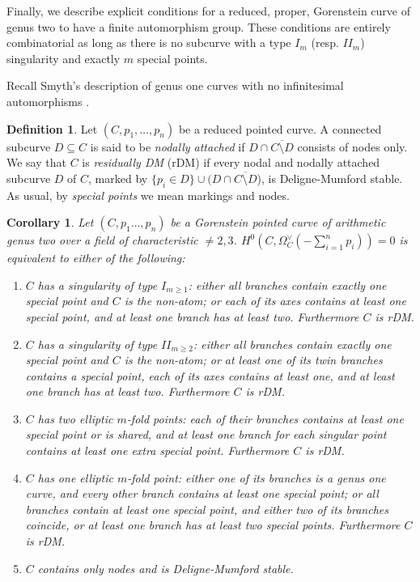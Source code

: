 \documentclass{compositio}
\theoremstyle{plain}
\newtheorem{cor}[thm]{Corollary}
\theoremstyle{definition}
\newtheorem{definition}[thm]{Definition}
\theoremstyle{remark}
\begin{document}
Finally, we describe explicit conditions for a reduced, proper, Gorenstein curve of genus two to have a finite automorphism group. These conditions are entirely combinatorial as long as there is no subcurve with a type $I_m$ (resp. $I\!I_m$) singularity and exactly $m$ special points. 

Recall Smyth's description of genus one curves with no infinitesimal automorphisms \cite[Proposition 2.3, Corollary 2.4]{SMY1}.

\begin{definition}
 Let $(C,p_1,\ldots,p_n)$ be a reduced pointed curve. A connected subcurve $D\subseteq C$ is said to be \emph{nodally attached} if $D\cap\overline{C\setminus D}$ consists of nodes only.
  We say that $C$ is \emph{residually DM} (rDM) if every nodal and nodally attached subcurve $D$ of $C$, marked by $\{p_i\in D\}\cup (D\cap\overline{C\setminus D}$), is Deligne-Mumford stable. As usual, by \emph{special points} we mean markings and nodes.
\end{definition}

\begin{cor}\label{cor:explicitnoaut}
 Let $(C,p_1\ldots,p_n)$ be a Gorenstein pointed curve of arithmetic genus two over a field of characteristic $\neq2,3$. $H^0(C,\Omega_C^\vee(-\sum_{i=1}^n p_i))=0$ is equivalent to either of the following:
 \begin{enumerate}[leftmargin=.6cm]
  \item $C$ has a singularity of type $I_{m\geq 1}$: either all branches contain exactly one special point and $C$ is the non-atom; or each of its axes contains at least one special point, and at least one branch has at least two. Furthermore $C$ is rDM.
  \item $C$ has a singularity of type $I\!I_{m\geq 2}$: either all branches contain exactly one special point and $C$ is the non-atom; or at least one of its twin branches contains a special point, each of its axes contains at least one, and at least one branch has at least two. Furthermore $C$ is rDM.
  \item $C$ has two elliptic $m$-fold points: each of their branches contains at least one special point or is shared, and at least one branch for each singular point contains at least one extra special point. Furthermore $C$ is rDM.
  \item $C$ has one elliptic $m$-fold point: either one of its branches is a genus one curve, and every other branch contains at least one special point; or all branches contain at least one special point, and either two of its branches coincide, or at least one branch has at least two special points. Furthermore $C$ is rDM.
  \item $C$ contains only nodes and is Deligne-Mumford stable.
 \end{enumerate}
\end{cor}
\end{document}
